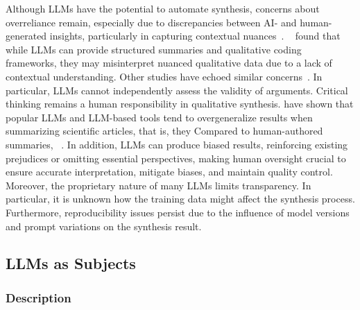 Although LLMs have the potential to automate synthesis, concerns about overreliance remain, especially due to discrepancies between AI- and human-generated insights, particularly in capturing contextual nuances~\cite{bano2023exploringqualitativeresearchusing}.
\citeauthor{bano2023exploringqualitativeresearchusing}~\cite{bano2023exploringqualitativeresearchusing} found that while LLMs can provide structured summaries and qualitative coding frameworks, they may misinterpret nuanced qualitative data due to a lack of contextual understanding.
Other studies have echoed similar concerns~\cite{DBLP:journals/ase/BanoHZT24, barros2024largelanguagemodelqualitative, leça2024applicationsimplicationslargelanguage}.
In particular, LLMs cannot independently assess the validity of arguments.
Critical thinking remains a human responsibility in qualitative synthesis.
\citeauthor{peterschineyee2025generalizationbias} have shown that popular LLMs and LLM-based tools tend to overgeneralize results when summarizing scientific articles, that is, they 
Compared to human-authored summaries, ~\cite{peterschineyee2025generalizationbias}.
In addition, LLMs can produce biased results, reinforcing existing prejudices or omitting essential perspectives, making human oversight crucial to ensure accurate interpretation, mitigate biases, and maintain quality control.
Moreover, the proprietary nature of many LLMs limits transparency.
In particular, it is unknown how the training data might affect the synthesis process.
Furthermore, reproducibility issues persist due to the influence of model versions and prompt variations on the synthesis result.


\subsection{LLMs as Subjects}
\label{sec:llms-as-subjects}

\subsubsection{Description}

